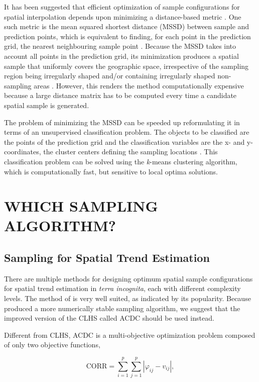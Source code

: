 It has been suggested that efficient optimization of sample configurations for spatial interpolation depends 
upon minimizing a distance-based metric \cite{RoyleEtAl1998}. One such metric is the mean squared shortest 
distance (MSSD) between sample and prediction points, which is equivalent to finding, for each point in the 
prediction grid, the nearest neighbouring sample point  \cite{BrusEtAl2006}. Because the MSSD takes into 
account all points in the prediction grid, its minimization produces a spatial sample that uniformly covers the 
geographic space, irrespective of the sampling region being irregularly shaped and/or containing 
irregularly shaped non-sampling areas \cite{WalvoortEtAl2010}. However, this renders the method computationally 
expensive because a large distance matrix has to be computed every time a candidate spatial sample is 
generated.

The problem of minimizing the MSSD can be speeded up reformulating it in terms of an unsupervised 
classification problem. The objects to be classified are the points of the prediction grid and the 
classification variables are the x- and y-coordinates, the cluster centers defining the sampling locations 
\cite{WalvoortEtAl2010}. This classification problem can be solved using the \textit{k}-means clustering 
algorithm, which is computationally fast, but sensitive to local optima solutions.

\section{WHICH SAMPLING ALGORITHM?}

\subsection{Sampling for Spatial Trend Estimation}

There are multiple methods for designing optimum spatial sample configurations for spatial trend estimation in 
\emph{terra incognita}, each with different complexity levels. The method of \citet{MinasnyEtAl2006b} is very 
well suited, as indicated by its popularity. Because \citet{Samuel-RosaEtAl2016} produced a more numerically 
stable sampling algorithm, we suggest that the improved version of the CLHS called ACDC should be used instead.

Different from CLHS, ACDC is a multi-objective optimization problem composed of only two objective functions,

\begin{equation} %
 \text{CORR} = \sum_{i=1}^{p}\sum_{j=1}^{p}|\varphi_{ij} - v_{ij}|,
\end{equation}\label{eqn:chap09-corr}

